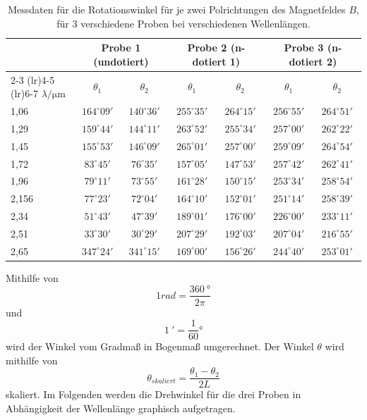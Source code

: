 \begin{table}[htpb]
    \centering
    \caption{Messdaten für die Rotationswinkel für je zwei Polrichtungen des Magnetfeldes $B$, für 3 verschiedene Proben bei verschiedenen Wellenlängen.}
    \label{tab:rotationswinkel}
    \begin{tabular}{lcccccc}
        \toprule
        & \multicolumn{2}{c}{Probe 1 (undotiert)} & \multicolumn{2}{c}{Probe 2 (n-dotiert 1)} & \multicolumn{2}{c}{Probe 3 (n-dotiert 2)} \\
        \cmidrule(lr){2-3} \cmidrule(lr){4-5} \cmidrule(lr){6-7}
        $\lambda/\mathrm{\mu m}$ & $\theta_1$ & $\theta_2$ & $\theta_1$ & $\theta_2$ & $\theta_1$ & $\theta_2$ \\
        \midrule
        1,06  & $164^\circ 09'$ & $140^\circ 36'$ & $255^\circ 35'$ & $264^\circ 15'$ & $256^\circ 55'$ & $264^\circ 51'$ \\
        1,29  & $159^\circ 44'$ & $144^\circ 11'$ & $263^\circ 52'$ & $255^\circ 34'$ & $257^\circ 00'$ & $262^\circ 22'$ \\
        1,45  & $155^\circ 53'$ & $146^\circ 09'$ & $265^\circ 01'$ & $257^\circ 00'$ & $259^\circ 09'$ & $264^\circ 54'$ \\
        1,72  & $83^\circ 45'$  & $76^\circ 35'$  & $157^\circ 05'$ & $147^\circ 53'$ & $257^\circ 42'$ & $262^\circ 41'$ \\
        1,96  & $79^\circ 11'$  & $73^\circ 55'$  & $161^\circ 28'$ & $150^\circ 15'$ & $253^\circ 34'$ & $258^\circ 54'$ \\
        2,156 & $77^\circ 23'$  & $72^\circ 04'$  & $164^\circ 10'$ & $152^\circ 01'$ & $251^\circ 14'$ & $258^\circ 39'$ \\
        2,34  & $51^\circ 43'$  & $47^\circ 39'$  & $189^\circ 01'$ & $176^\circ 00'$ & $226^\circ 00'$ & $233^\circ 11'$ \\
        2,51  & $33^\circ 30'$  & $30^\circ 29'$  & $207^\circ 29'$ & $192^\circ 03'$ & $207^\circ 04'$ & $216^\circ 55'$ \\
        2,65  & $347^\circ 24'$ & $341^\circ 15'$ & $169^\circ 00'$ & $156^\circ 26'$ & $244^\circ 40'$ & $253^\circ 01'$ \\
        \bottomrule
    \end{tabular}
\end{table}

Mithilfe von 
\begin{equation}
    1 rad = \frac{\qty{360}{\degree}}{2 \pi}\end{equation}
und 
\begin{equation*}
    \qty{1}{\arcminute} = \frac{1}{60} \unit{\degree}\end{equation*}
wird der Winkel vom Gradmaß in Bogenmaß umgerechnet.
Der Winkel $\theta$ wird mithilfe von 
\begin{equation*}
    \theta_{skaliert} = \frac{\theta_1 - \theta_2}{2L}
\end{equation*}
skaliert.
Im Folgenden werden die Drehwinkel für die drei Proben in Abhängigkeit der Wellenlänge graphisch aufgetragen. 

